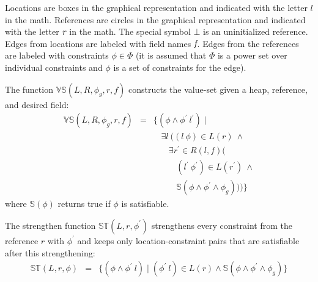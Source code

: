 Locations are boxes in the graphical representation and indicated with
the letter $l$ in the math. References are circles in the graphical
representation and indicated with the letter $\emph{r}$ in the
math. The special symbol $\bot$ is an uninitialized reference. Edges
from locations are labeled with field names $\emph{f}$. Edges from
the references are labeled with constraints $\phi \in \Phi$ (it is
assumed that $\Phi$ is a power set over individual constraints and
$\phi$ is a set of constraints for the edge).

The function $\mathbb{VS}(L,R,\phi_g,r,f)$ constructs the value-set given a
heap, reference, and desired field:
\[
\begin{array}{rcl}
  \mathbb{VS}(L,R,\phi_g,r,f) & = & \{(\phi\wedge\phi^\prime\ l^\prime) \mid \\
  & & \ \ \ \ \exists l\ ((l\ \phi) \in L(r)\ \wedge \\
  & & \ \ \ \ \ \ \ \ \exists r^\prime \in R(l,f) ( \\
  & & \ \ \ \ \ \ \ \ \ \ \ \ (l^\prime\ \phi^\prime) \in L(r^\prime)\ \wedge\\
  & & \ \ \ \ \ \ \ \ \ \ \ \ \mathbb{S}(\phi\wedge\phi^\prime\wedge \phi_g)))\}
\end{array}
\]
where $\mathbb{S}(\phi)$ returns true if $\phi$ is satisfiable.

The strengthen function $\mathbb{ST}(L,r,\phi^\prime)$ strengthens every
constraint from the reference $r$ with $\phi^\prime$ and keeps only location-constraint
pairs that are satisfiable after this strengthening:
\[
\begin{array}{rcl} 
\mathbb{ST}(L,r,\phi) & = & \{ (\phi\wedge\phi^\prime\ l) \mid 
(\phi^\prime\ l)\in L(r)\wedge\mathbb{S}(\phi\wedge\phi^\prime\wedge\phi_g) \}
\end{array}
\]






